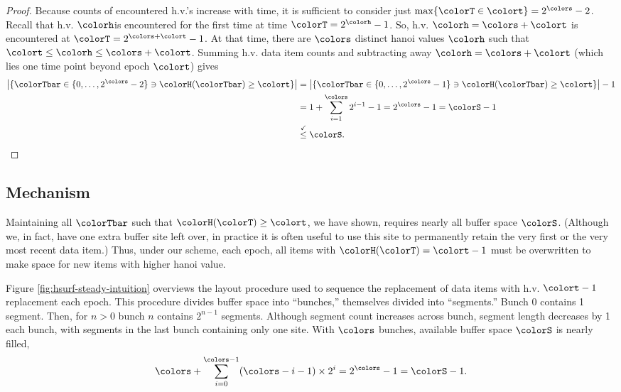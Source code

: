 \begin{proof}
Because counts of encountered h.v.'s increase with time, it is sufficient to consider just $\max\{\colorT \in \colort\} = 2^{\colors} - 2$.
Recall that h.v. $\colorh $is encountered for the first time at time $\colorT = 2^{\colorh} - 1$.
So, h.v. $\colorh = \colors + \colort$ is encountered at $\colorT = 2^{\colors + \colort} - 1$.
At that time, there are $\colors$ distinct hanoi values $\colorh$ such that $\colort \leq \colorh \leq \colors + \colort$.
Summing h.v. data item counts and subtracting away $\colorh = \colors + \colort$ (which lies one time point beyond epoch $\colort$) gives
\begin{align*}
\left| \{\colorTbar \in \{0, \ldots, 2^{\colors} - 2 \} \ni \colorH(\colorTbar) \geq \colort \} \right|
&= \left| \{\colorTbar \in \{0, \ldots, 2^{\colors} - 1 \} \ni \colorH(\colorTbar) \geq \colort \} \right| - 1\\
&= 1 + \sum_{i=1}^{\colors} 2^{i - 1} - 1 = 2^{\colors} - 1 = \colorS - 1\\
&\stackrel{\checkmark}{\leq} \colorS.
\end{align*}
\end{proof}

\subsection{Mechanism}



Maintaining all $\colorTbar$ such that $\colorH(\colorT) \geq \colort$, we have shown, requires nearly all buffer space $\colorS$.
(Although we, in fact, have one extra buffer site left over, in practice it is often useful to use this site to permanently retain the very first or the very most recent data item.)
Thus, under our scheme, each epoch, all items with $\colorH(\colorT) = \colort - 1$ must be overwritten to make space for new items with higher hanoi value.

Figure \ref{fig:hsurf-steady-intuition} overviews the layout procedure used to sequence the replacement of data items with h.v. $\colort - 1$ replacement each epoch.
This procedure divides buffer space into ``bunches,'' themselves divided into ``segments.''
Bunch 0 contains 1 segment.
Then, for $n > 0$ bunch $n$ contains $2^{n-1}$ segments.
Although segment count increases across bunch, segment length decreases by 1 each bunch, with segments in the last bunch containing only one site.
With $\colors$ bunches, available buffer space $\colorS$ is nearly filled,
\begin{align*}
\colors + \sum_{i=0}^{\colors-1} (\colors - i - 1) \times 2^{i} = 2^{\colors} - 1 = \colorS - 1.
\end{align*}

